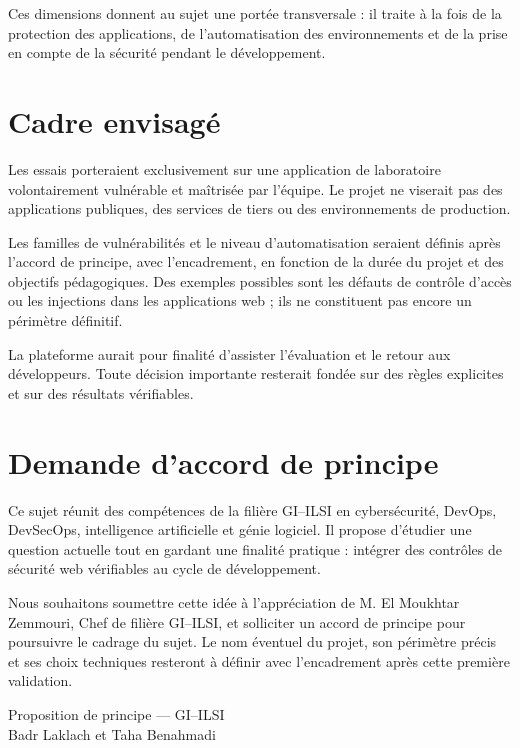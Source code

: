 \documentclass[11pt,a4paper]{article}
\begin{document}
Ces dimensions donnent au sujet une portée transversale : il traite à la fois de la protection des applications, de l'automatisation des environnements et de la prise en compte de la sécurité pendant le développement.

\section{Cadre envisagé}

Les essais porteraient exclusivement sur une application de laboratoire volontairement vulnérable et maîtrisée par l'équipe. Le projet ne viserait pas des applications publiques, des services de tiers ou des environnements de production.

Les familles de vulnérabilités et le niveau d'automatisation seraient définis après l'accord de principe, avec l'encadrement, en fonction de la durée du projet et des objectifs pédagogiques. Des exemples possibles sont les défauts de contrôle d'accès ou les injections dans les applications web ; ils ne constituent pas encore un périmètre définitif.

La plateforme aurait pour finalité d'assister l'évaluation et le retour aux développeurs. Toute décision importante resterait fondée sur des règles explicites et sur des résultats vérifiables.

\section{Demande d'accord de principe}

Ce sujet réunit des compétences de la filière GI--ILSI en cybersécurité, DevOps, DevSecOps, intelligence artificielle et génie logiciel. Il propose d'étudier une question actuelle tout en gardant une finalité pratique : intégrer des contrôles de sécurité web vérifiables au cycle de développement.

Nous souhaitons soumettre cette idée à l'appréciation de M. El Moukhtar Zemmouri, Chef de filière GI--ILSI, et solliciter un accord de principe pour poursuivre le cadrage du sujet. Le nom éventuel du projet, son périmètre précis et ses choix techniques resteront à définir avec l'encadrement après cette première validation.

\vfill
\begin{center}
\begin{tcolorbox}[
  colback=PaleBlue,colframe=Blue!30,boxrule=0.5pt,arc=2mm,
  width=0.94\textwidth,left=3mm,right=3mm,top=2mm,bottom=2mm
]
\centering\small\color{Muted}
Proposition de principe — GI--ILSI\\
Badr Laklach et Taha Benahmadi
\end{tcolorbox}
\end{center}
\end{document}
